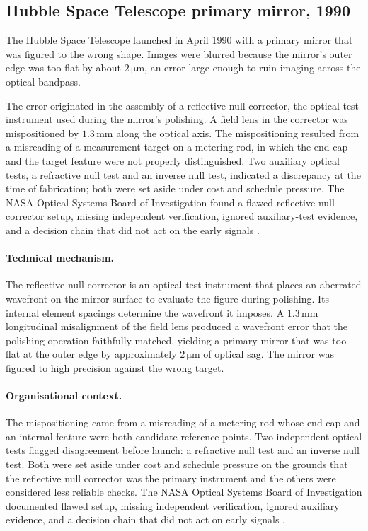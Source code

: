 \subsection{Hubble Space Telescope primary mirror, 1990}

The Hubble Space Telescope launched in April 1990 with a primary
mirror that was figured to the wrong shape. Images were blurred
because the mirror's outer edge was too flat by about $2 \,\si
{\micro\meter}$, an error large enough to ruin imaging across the
optical bandpass.

The error originated in the assembly of a reflective null corrector,
the optical-test instrument used during the mirror's polishing. A
field lens in the corrector was mispositioned by $1.3 \,\si{\milli
\meter}$ along the optical axis. The mispositioning resulted from a
misreading of a measurement target on a metering rod, in which the
end cap and the target feature were not properly distinguished. Two
auxiliary optical tests, a refractive null test and an inverse null
test, indicated a discrepancy at the time of fabrication; both were
set aside under cost and schedule pressure. The NASA Optical Systems
Board of Investigation found a flawed reflective-null-corrector
setup, missing independent verification, ignored auxiliary-test
evidence, and a decision chain that did not act on the early signals
\cite{acc:nasa-hubble-optical-systems-1990}.

\paragraph{Technical mechanism.} The reflective null corrector is an
optical-test instrument that places an aberrated wavefront on the
mirror surface to evaluate the figure during polishing. Its
internal element spacings determine the wavefront it imposes. A
$1.3 \,\si{\milli\meter}$ longitudinal misalignment of the field
lens produced a wavefront error that the polishing operation
faithfully matched, yielding a primary mirror that was too flat at
the outer edge by approximately $2 \,\si{\micro\meter}$ of optical
sag. The mirror was figured to high precision against the wrong
target.

\paragraph{Organisational context.} The mispositioning came from a
misreading of a metering rod whose end cap and an internal feature
were both candidate reference points. Two independent optical tests
flagged disagreement before launch: a refractive null test and an
inverse null test. Both were set aside under cost and schedule
pressure on the grounds that the reflective null corrector was the
primary instrument and the others were considered less reliable
checks. The NASA Optical Systems Board of Investigation documented
flawed setup, missing independent verification, ignored auxiliary
evidence, and a decision chain that did not act on early signals
\cite{acc:nasa-hubble-optical-systems-1990}.

